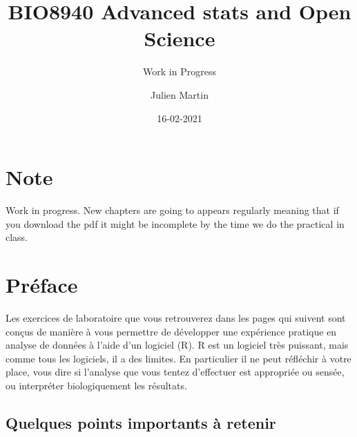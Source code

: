 \documentclass[
  12pt,
]{book}
\title{BIO8940 Advanced stats and Open Science}
\subtitle{Work in Progress}
\author{Julien Martin}
\date{16-02-2021}
\makeatletter
\newenvironment{kframe}{%
\medskip{}
\setlength{\fboxsep}{.8em}
\def\at@end@of@kframe{}%
\ifinner\ifhmode%
 \def\at@end@of@kframe{\end{minipage}}%
 \begin{minipage}{\columnwidth}%
\fi\fi%
\def\FrameCommand##1{\hskip\@totalleftmargin \hskip-\fboxsep
\colorbox{incolor}{##1}\hskip-\fboxsep
    \hskip-\linewidth \hskip-\@totalleftmargin \hskip\columnwidth}%
\MakeFramed {\advance\hsize-\width
  \@totalleftmargin\z@ \linewidth\hsize
  \@setminipage}}%
{\par\unskip\endMakeFramed%
\at@end@of@kframe}
\newenvironment{rmdblock}[1]
 {
 \begin{itemize}
 \renewcommand{\labelitemi}{
   \raisebox{-.7\height}[0pt][0pt]{
     {\setkeys{Gin}{width=3em,keepaspectratio}\texttt{[image: images/icons/\#1]}}
   }
 }
 \begin{kframe}
 \setlength{\fboxsep}{1em}
 \item
 }
 {
 \end{kframe}
 \end{itemize}
 }
\newenvironment{rmdimportant}
  {\begin{rmdblock}{important}}
  {\end{rmdblock}}
\makeatother
\begin{document}
\maketitle



{
\setcounter{tocdepth}{1}
\tableofcontents
}
\hypertarget{note}{%
\chapter*{Note}\label{note}}

\begin{rmdimportant}
Work in progress. New chapters are going to appears regularly meaning that if you download the pdf it might be incomplete by the time we do the practical in class.
\end{rmdimportant}

\hypertarget{pruxe9face}{%
\chapter*{Préface}\label{pruxe9face}}

Les exercices de laboratoire que vous retrouverez dans les pages qui suivent sont conçus de manière à vous permettre de développer une expérience pratique en analyse de données à l'aide d'un logiciel (R).
R est un logiciel très puissant, mais comme tous les logiciels, il a des limites.
En particulier il ne peut réfléchir à votre place, vous dire si l'analyse que vous tentez d'effectuer est appropriée ou sensée, ou interpréter biologiquement les résultats.

\hypertarget{quelques-points-importants-uxe0-retenir}{%
\section*{Quelques points importants à retenir}\label{quelques-points-importants-uxe0-retenir}}
\end{document}
